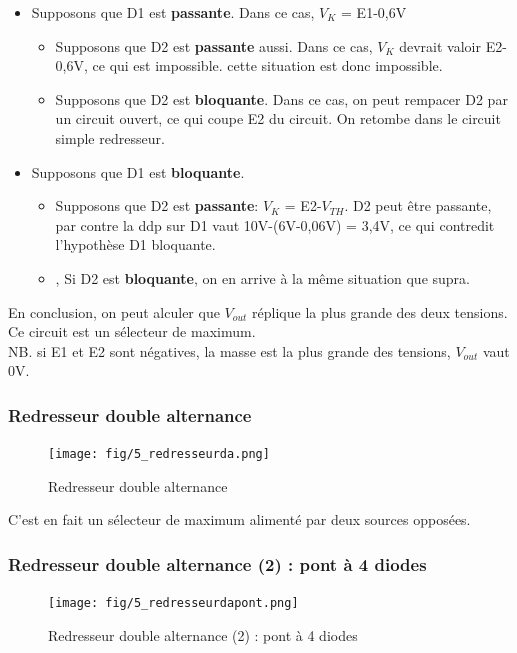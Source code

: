 \documentclass[a4paper]{article}
\begin{document}
    \begin{itemize}
        \item Supposons que D1 est \textbf{passante}. Dans ce cas, $V_K$ = E1-0,6V
        \begin{itemize}
            \item Supposons que D2 est \textbf{passante} aussi. Dans ce cas, $V_K$ devrait
            valoir E2-0,6V, ce qui est impossible. cette situation est donc impossible.
            \item Supposons que D2 est \textbf{bloquante}. Dans ce cas, on peut
            rempacer D2 par un circuit ouvert, ce qui coupe E2 du circuit. On 
            retombe dans le circuit simple redresseur.
        \end{itemize}
        \item Supposons que D1 est \textbf{bloquante}.
        \begin{itemize}
            \item Supposons que D2 est \textbf{passante}: $V_K$ = E2-$V_{TH}$. 
            D2 peut être passante, par contre la ddp sur D1 vaut 10V-(6V-0,06V) = 3,4V,
            ce qui contredit l'hypothèse D1 bloquante.
            \item, Si D2 est \textbf{bloquante}, on en arrive à la même situation
            que supra.
        \end{itemize}
    \end{itemize}
    En conclusion, on peut alculer que $V_{out}$ réplique la plus grande des deux
    tensions. Ce circuit est un sélecteur de maximum.\\

    NB. si E1 et E2 sont négatives, la masse est la plus grande des tensions, 
    $V_{out}$ vaut 0V.

    \subsubsection{Redresseur double alternance}
    \begin{figure}[H]
        \begin{center}
            \texttt{[image: fig/5\_redresseurda.png]}
            \caption{Redresseur double alternance}
            \label{fig:5_redresseurda}
        \end{center}
    \end{figure}
    C'est en fait un sélecteur de maximum alimenté par deux sources opposées.

    \subsubsection{Redresseur double alternance (2) : pont à 4 diodes}
    \begin{figure}[H]
        \begin{center}
            \texttt{[image: fig/5\_redresseurdapont.png]}
            \caption{Redresseur double alternance (2) : pont à 4 diodes}
            \label{fig:5_redresseurdapont}
        \end{center}
    \end{figure}
\end{document}
